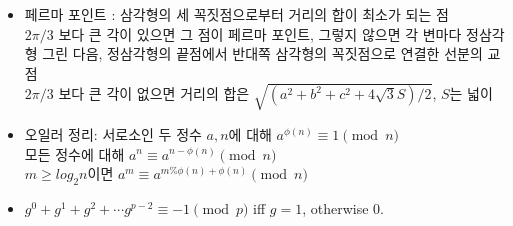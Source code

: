 \documentclass[landscape, 8pt, a4paper, twocolumn]{extarticle} %
\begin{document}
\begin{itemize}
\item 페르마 포인트 : 삼각형의 세 꼭짓점으로부터 거리의 합이 최소가 되는 점\\
$2\pi/3$ 보다 큰 각이 있으면 그 점이 페르마 포인트, 그렇지 않으면 각 변마다 정삼각형 그린 다음, 정삼각형의 끝점에서 반대쪽 삼각형의 꼭짓점으로 연결한 선분의 교점\\
$2\pi/3$ 보다 큰 각이 없으면 거리의 합은 $\sqrt{(a^2 + b^2 + c^2 + 4\sqrt 3 S) / 2}$, $S$는 넓이

\item 오일러 정리: 서로소인 두 정수 $a,n$에 대해 $a^{\phi(n)}\equiv 1 \pmod n$\\
모든 정수에 대해 $a^n \equiv a^{n-\phi(n)} \pmod n$\\
$m\geq log_2 n$이면 $a^m\equiv a^{m\%\phi(n)+\phi(n)}\pmod n$

\item $g^0+g^1+g^2+\cdots g^{p-2}\equiv -1 \pmod p$ iff $g=1$, otherwise $0$.

\end{itemize}
\end{document}
